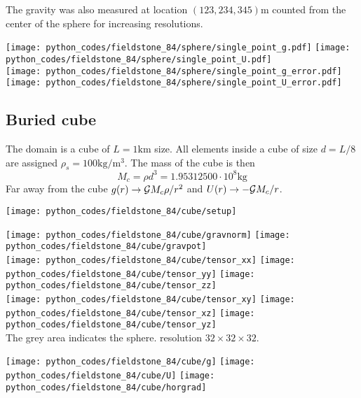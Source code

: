 The gravity was also measured at location $(123,234,345)\si{\metre}$ counted from the center of the sphere
for increasing resolutions. 

\begin{center}
\texttt{[image: python\_codes/fieldstone\_84/sphere/single\_point\_g.pdf]}
\texttt{[image: python\_codes/fieldstone\_84/sphere/single\_point\_U.pdf]}\\
\texttt{[image: python\_codes/fieldstone\_84/sphere/single\_point\_g\_error.pdf]}
\texttt{[image: python\_codes/fieldstone\_84/sphere/single\_point\_U\_error.pdf]}
\end{center}


\newpage
\subsection*{Buried cube}

The domain is a cube of $L=1\si{\km}$ size. All elements inside a cube of size $d=L/8$ are assigned
$\rho_s=100\si{\kg\per\cubic\metre}$.
The mass of the cube is then
\[
M_c = \rho d^3 = 1.95312500\cdot 10^8 \si{\kg}
\]
Far away from the cube $g(r) \rightarrow {\cal G}M_c \rho/r^2$ and $U(r) \rightarrow -{\cal G} M_c/r$.

\begin{center}
\texttt{[image: python\_codes/fieldstone\_84/cube/setup]}
\end{center}


\begin{center}
\texttt{[image: python\_codes/fieldstone\_84/cube/gravnorm]}
\texttt{[image: python\_codes/fieldstone\_84/cube/gravpot]}\\
\texttt{[image: python\_codes/fieldstone\_84/cube/tensor\_xx]}
\texttt{[image: python\_codes/fieldstone\_84/cube/tensor\_yy]}
\texttt{[image: python\_codes/fieldstone\_84/cube/tensor\_zz]}\\
\texttt{[image: python\_codes/fieldstone\_84/cube/tensor\_xy]}
\texttt{[image: python\_codes/fieldstone\_84/cube/tensor\_xz]}
\texttt{[image: python\_codes/fieldstone\_84/cube/tensor\_yz]}\\
{\captionfont  The grey area indicates the sphere. resolution $32\times 32 \times 32$.}
\end{center}

\begin{center}
\texttt{[image: python\_codes/fieldstone\_84/cube/g]}
\texttt{[image: python\_codes/fieldstone\_84/cube/U]}
\texttt{[image: python\_codes/fieldstone\_84/cube/horgrad]}
\end{center}

